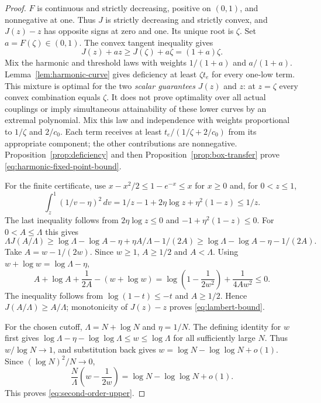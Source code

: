 \begin{proof}
$F$ is continuous and strictly decreasing, positive on $(0,1)$, and
nonnegative at one. Thus $J$ is strictly decreasing and strictly convex,
and $J(z)-z$ has opposite signs at zero and one. Its unique root is
$\zeta$. Set $a=F(\zeta)\in(0,1)$. The convex tangent inequality gives
\[
 J(z)+az\ge J(\zeta)+a\zeta=(1+a)\zeta.
\]
Mix the harmonic and threshold laws with weights $1/(1+a)$ and
$a/(1+a)$. Lemma~\ref{lem:harmonic-curve} gives deficiency at least
$\zeta t_e$ for every one-low term. This mixture is optimal for the two
\emph{scalar guarantees} $J(z)$ and $z$: at $z=\zeta$ every convex
combination equals $\zeta$. It does not prove optimality over all actual
couplings or imply simultaneous attainability of these lower curves by
an extremal polynomial. Mix this law and independence with weights
proportional to $1/\zeta$ and $2/c_0$. Each term receives at least
$t_e/(1/\zeta+2/c_0)$ from its appropriate component; the other
contributions are nonnegative. Proposition~\ref{prop:deficiency} and
then Proposition~\ref{prop:box-transfer} prove
\eqref{eq:harmonic-fixed-point-bound}.

For the finite certificate, use $x-x^2/2\le1-e^{-x}\le x$ for $x\ge0$
and, for $0<z\le1$,
\[
 \int_z^1(1/v-\eta)^2\,dv
 =1/z-1+2\eta\log z+\eta^2(1-z)\le1/z.
\]
The last inequality follows from $2\eta\log z\le0$ and
$-1+\eta^2(1-z)\le0$. For $0<A\le\Lambda$ this gives
\begin{equation}\label{eq:lambert-integral-certificate}
 \Lambda J(A/\Lambda)
 \ge\log\Lambda-\log A-\eta+\eta A/\Lambda-1/(2A)
 \ge\log\Lambda-\log A-\eta-1/(2A).
\end{equation}
Take $A=w-1/(2w)$. Since $w\ge1$, $A\ge1/2$ and $A<\Lambda$.
Using $w+\log w=\log\Lambda-\eta$,
\[
 A+\log A+\frac1{2A}-(w+\log w)
 =\log\left(1-\frac1{2w^2}\right)+\frac1{4Aw^2}\le0.
\]
The inequality follows from $\log(1-t)\le-t$ and $A\ge1/2$.
Hence $J(A/\Lambda)\ge A/\Lambda$; monotonicity of $J(z)-z$ proves
\eqref{eq:lambert-bound}.

For the chosen cutoff, $\Lambda=N+\log N$ and $\eta=1/N$. The defining
identity for $w$ first gives
$\log\Lambda-\eta-\log\log\Lambda\le w\le\log\Lambda$
for all sufficiently large $N$. Thus $w/\log N\to1$, and substitution
back gives $w=\log N-\log\log N+o(1)$. Since
$(\log N)^2/N\to0$,
\[
 \frac{N}{\Lambda}\left(w-\frac1{2w}\right)
 =\log N-\log\log N+o(1).
\]
This proves \eqref{eq:second-order-upper}.
\end{proof}

